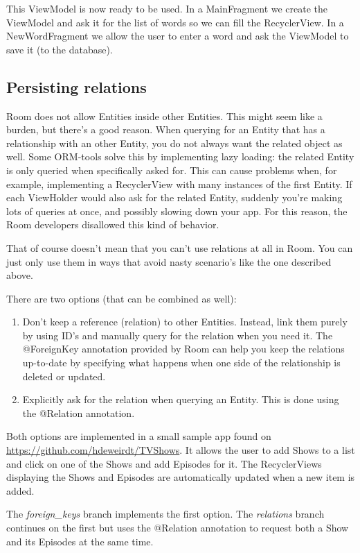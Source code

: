 This ViewModel is now ready to be used.
In a MainFragment we create the ViewModel and ask it for the list of words so we can fill the RecyclerView.
In a NewWordFragment we allow the user to enter a word and ask the ViewModel to save it (to the database).

\subsection{Persisting relations}
Room does not allow Entities inside other Entities\cite{RoomDevTalk}.
This might seem like a burden, but there's a good reason. 
When querying for an Entity that has a relationship with an other Entity, you do not always want the related object as well.
Some ORM-tools solve this by implementing lazy loading: the related Entity is only queried when specifically asked for.
This can cause problems when, for example, implementing a RecyclerView with many instances of the first Entity.
If each ViewHolder would also ask for the related Entity, suddenly you're making lots of queries at once, and possibly slowing down your app.
For this reason, the Room developers disallowed this kind of behavior.

That of course doesn't mean that you can't use relations at all in Room.
You can just only use them in ways that avoid nasty scenario's like the one described above. 

There are two options (that can be combined as well):
\begin{enumerate}
	\item Don't keep a reference (relation) to other Entities.
		Instead, link them purely by using ID's and manually query for the relation when you need it.
		The @ForeignKey annotation provided by Room can help you keep the relations up-to-date by specifying what happens when one side of the relationship is deleted or updated.
	\item Explicitly ask for the relation when querying an Entity. 
		This is done using the @Relation annotation.		
\end{enumerate}

Both options are implemented in a small sample app found on \url{https://github.com/hdeweirdt/TVShows}.
It allows the user to add Shows to a list and click on one of the Shows and add Episodes for it.
The RecyclerViews displaying the Shows and Episodes are automatically updated when a new item is added.

The \textit{foreign\_keys} branch implements the first option.
The \textit{relations} branch continues on the first but uses the @Relation annotation to request both a Show and its Episodes at the same time.

